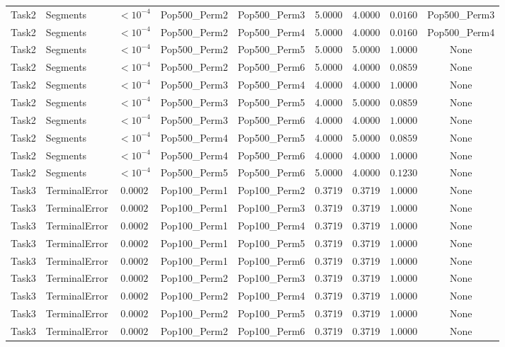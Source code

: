\documentclass[8pt]{article}
\begin{document}
\begin{longtable}{llccccccc}
Task2 & Segments & $< 10^{-4}$ & Pop500\_Perm2 & Pop500\_Perm3 & 5.0000 & 4.0000 & $0.0160$ & Pop500\_Perm3 \\
Task2 & Segments & $< 10^{-4}$ & Pop500\_Perm2 & Pop500\_Perm4 & 5.0000 & 4.0000 & $0.0160$ & Pop500\_Perm4 \\
Task2 & Segments & $< 10^{-4}$ & Pop500\_Perm2 & Pop500\_Perm5 & 5.0000 & 5.0000 & $1.0000$ & None \\
Task2 & Segments & $< 10^{-4}$ & Pop500\_Perm2 & Pop500\_Perm6 & 5.0000 & 4.0000 & $0.0859$ & None \\
Task2 & Segments & $< 10^{-4}$ & Pop500\_Perm3 & Pop500\_Perm4 & 4.0000 & 4.0000 & $1.0000$ & None \\
Task2 & Segments & $< 10^{-4}$ & Pop500\_Perm3 & Pop500\_Perm5 & 4.0000 & 5.0000 & $0.0859$ & None \\
Task2 & Segments & $< 10^{-4}$ & Pop500\_Perm3 & Pop500\_Perm6 & 4.0000 & 4.0000 & $1.0000$ & None \\
Task2 & Segments & $< 10^{-4}$ & Pop500\_Perm4 & Pop500\_Perm5 & 4.0000 & 5.0000 & $0.0859$ & None \\
Task2 & Segments & $< 10^{-4}$ & Pop500\_Perm4 & Pop500\_Perm6 & 4.0000 & 4.0000 & $1.0000$ & None \\
Task2 & Segments & $< 10^{-4}$ & Pop500\_Perm5 & Pop500\_Perm6 & 5.0000 & 4.0000 & $0.1230$ & None \\
Task3 & TerminalError & $0.0002$ & Pop100\_Perm1 & Pop100\_Perm2 & 0.3719 & 0.3719 & $1.0000$ & None \\
Task3 & TerminalError & $0.0002$ & Pop100\_Perm1 & Pop100\_Perm3 & 0.3719 & 0.3719 & $1.0000$ & None \\
Task3 & TerminalError & $0.0002$ & Pop100\_Perm1 & Pop100\_Perm4 & 0.3719 & 0.3719 & $1.0000$ & None \\
Task3 & TerminalError & $0.0002$ & Pop100\_Perm1 & Pop100\_Perm5 & 0.3719 & 0.3719 & $1.0000$ & None \\
Task3 & TerminalError & $0.0002$ & Pop100\_Perm1 & Pop100\_Perm6 & 0.3719 & 0.3719 & $1.0000$ & None \\
Task3 & TerminalError & $0.0002$ & Pop100\_Perm2 & Pop100\_Perm3 & 0.3719 & 0.3719 & $1.0000$ & None \\
Task3 & TerminalError & $0.0002$ & Pop100\_Perm2 & Pop100\_Perm4 & 0.3719 & 0.3719 & $1.0000$ & None \\
Task3 & TerminalError & $0.0002$ & Pop100\_Perm2 & Pop100\_Perm5 & 0.3719 & 0.3719 & $1.0000$ & None \\
Task3 & TerminalError & $0.0002$ & Pop100\_Perm2 & Pop100\_Perm6 & 0.3719 & 0.3719 & $1.0000$ & None \\

\end{longtable}
\end{document}
